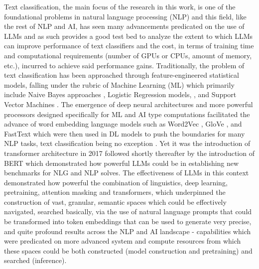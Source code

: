 \documentclass[final]{clv2025}
\begin{document}
Text classification, the main focus of the research in this work, is one of the foundational problems in natural language processing (NLP) and this field, like the rest of NLP and AI, has seen many advancements predicated on the use of LLMs and as such provides a good test bed to analyze the extent to which LLMs can improve performance of text classifiers and the cost, in terms of training time and computational requirements (number of GPUs or CPUs, amount of memory, etc.), incurred to achieve said performance gains. Traditionally, the problem of text classification has been approached through feature-engineered statistical models, falling under the rubric of Machine Learning (ML) which primarily include Naive Bayes approaches \cite{mccallum1998comparison}, Logistic Regression models, \cite{genkin01082007}, and Support Vector Machines \cite{joachims1998text}. The emergence of deep neural architectures and more powerful processors designed specifically for ML and AI type computations facilitated the advance of word embedding language models such as Word2Vec \cite{mikolov}, GloVe \cite{pennington}, and FastText \cite{articleboja} which were then used in DL models to push the boundaries for many NLP tasks, text classification being no exception \cite{zhang2015character} \cite{yoon2014convolutional} \cite{hochreiterlong}. Yet it was the introduction of transformer architecture in 2017 \cite{vaswani} followed shortly thereafter by the introduction of BERT \cite{devlin-etal-2019-bert} which demonstrated how powerful LLMs could be in establishing new benchmarks for NLG and NLP solves. The effectiveness of LLMs in this context demonstrated how powerful the combination of linguistics, deep learning, pretraining, attention masking and transformers, which underpinned the construction of vast, granular, semantic spaces which could be effectively navigated, searched basically, via the use of natural language prompts that could be transformed into token embeddings that can be used to generate very precise, and quite profound results across the NLP and AI landscape - capabilities which were predicated on  more advanced system and compute resources from which these spaces could be both constructed (model construction and pretraining) and searched (inference). 
\end{document}
